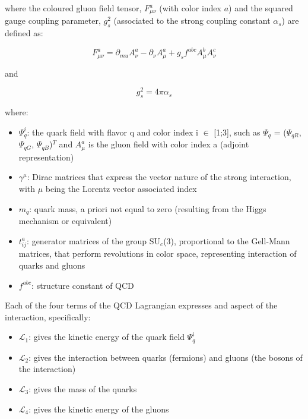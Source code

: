 where the coloured gluon field tensor, $F_{\mu\nu}^{a}$ (with color index $a$) and the squared gauge coupling parameter, $g_{s}^{2}$ (associated to the strong coupling constant $\alpha_{s}$) are
defined as:

\begin{equation}\label{label:F}
F_{\mu\nu}^{a} = \partial_{mu}A_{\nu}^{a} - \partial_{\nu}A_{\mu}^{a} + g_{s}f^{abc}A_{\mu}^{b}A_{\nu}^{c} \end{equation}

and

\begin{equation}\label{label:g}
g_{s}^{2} = 4\pi\alpha_{s}
\end{equation}

where:

\begin{itemize}
\item $\Psi_{q}^{i}$: the quark field with flavor q and color index i $\in$ [1;3], such as $\Psi_{q}$ = ($\Psi_{qR}$, $\Psi_{qG}$, $\Psi_{qB}$)$^{T}$ and $A_{\mu}^{a}$ is the gluon field with color index a (adjoint representation)
\item $\gamma^{\mu}$: Dirac matrices that express the vector nature of the strong interaction, with $\mu$ being the Lorentz vector associated index
\item $m_{q}$: quark mass, a priori not equal to zero (resulting from the Higgs mechanism or equivalent)
\item $t_{ij}^{a}$: generator matrices of the group SU$_{c}$(3), proportional to the Gell-Mann matrices, that perform revolutions in color space, representing interaction of quarks and gluons
\item $f^{abc}$: structure constant of QCD
\end{itemize}

Each of the four terms of the QCD Lagrangian expresses and aspect of the interaction, specifically:

\begin{itemize}
\item $\mathcal{L}_{1}$: gives the kinetic energy of the quark field $\Psi_{q}^{i}$
\item $\mathcal{L}_{2}$: gives the interaction between quarks (fermions) and gluons (the bosons of the interaction)
\item $\mathcal{L}_{3}$: gives the mass of the quarks
\item $\mathcal{L}_{4}$: gives the kinetic energy of the gluons
\end{itemize}

